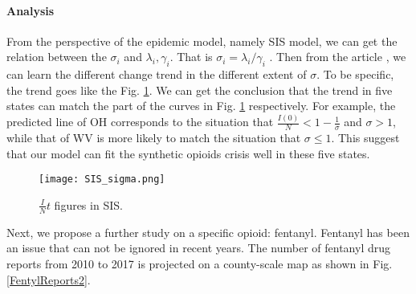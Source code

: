 
\paragraph{Analysis}
From the perspective of the epidemic model, namely SIS model, we can get the relation between the $\sigma_i$ and $\lambda_i , \gamma_i$. That is $\sigma _i=\lambda _i/\gamma _i$ . Then from the article \cite{8}, we can learn the different change trend in the different extent of $\sigma$. To be specific, the trend goes like the Fig. \ref{SIS_sigma}. We can get the conclusion that the trend in five states can match the part of the curves in Fig. \ref{SIS_sigma} respectively. For example, the predicted line of OH corresponds to the situation that $\frac{I\left( 0 \right)}{N}<1-\frac{1}{\sigma}$ and $\sigma>1$, while that of WV is more likely to match the situation that $ \sigma \leqslant 1$. This suggest that our model can fit the synthetic opioids crisis well in these five states.
\begin{figure}
	\centering
	\texttt{[image: SIS\_sigma.png]}
	\caption{$\frac{I}{N}$\text{-}$t$ figures in SIS.}
	\label{SIS_sigma}
\end{figure}

Next, we propose a further study on a specific opioid: fentanyl. Fentanyl has been an issue that can not be ignored in recent years. The number of fentanyl drug reports from 2010 to 2017 is projected on a county-scale map as shown in Fig. \ref{FentylReports2}.

